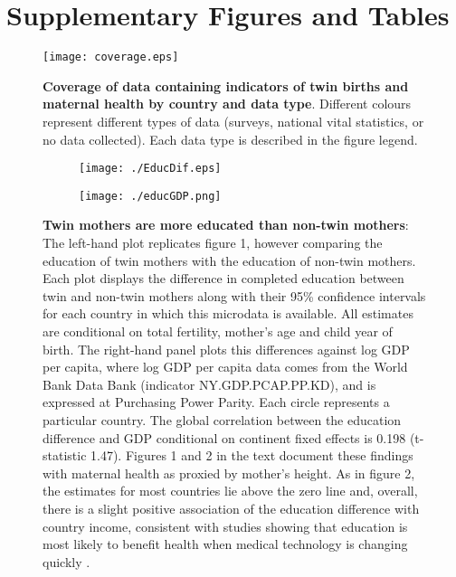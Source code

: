 \documentclass[12pt]{article}
\begin{document}
\section{Supplementary Figures and Tables}
\begin{spacing}{1}

\begin{figure}[htpb!]
\texttt{[image: coverage.eps]}
\caption{\textbf{Coverage of data containing indicators of twin births and maternal health by country and data type}. {\footnotesize  Different colours represent different types of data (surveys, national vital statistics, or no data collected).  Each data type is described in the figure legend.}}
\label{fig:twincoverage}
\end{figure}

  
\begin{figure}[htpb!]
\begin{subfigure}{.5\textwidth}
  \texttt{[image: ./EducDif.eps]}
\end{subfigure}%
\begin{subfigure}{.5\textwidth}
  \texttt{[image: ./educGDP.png]}
\end{subfigure}%
\vspace{5mm}
\caption{\textbf{Twin mothers are more educated than non-twin mothers}: {\footnotesize The left-hand plot replicates figure 1, however comparing the education of twin mothers with the education of non-twin mothers.  Each plot displays the difference in completed education between twin and non-twin mothers along with their 95\% confidence intervals for each country in which this microdata is available.  All estimates are conditional on total fertility, mother's age and child year of birth.  The right-hand panel plots this differences against log GDP per capita, where log GDP per capita data comes from the World Bank Data Bank (indicator NY.GDP.PCAP.PP.KD), and is expressed at Purchasing Power Parity.  Each circle represents a particular country. The global correlation between the education difference and GDP conditional on continent fixed effects is 0.198 (t-statistic 1.47). Figures 1 and 2 in the text document these findings with maternal health as proxied by mother's height. As in figure 2, the estimates for most countries lie above the zero line and, overall, there is a slight positive association of the education difference with country income, consistent with studies showing that education is most likely to benefit health when medical technology is changing quickly \cite{LlerasMuneyGlied2008}.}}
\label{fig:educAll}
\end{figure}


\end{spacing}
\end{document}
